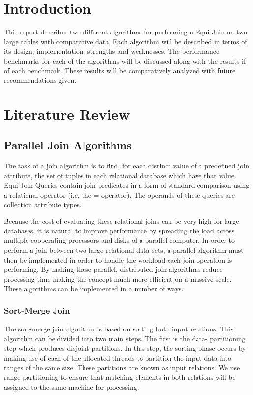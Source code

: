 \documentclass[10pt,twocolumn]{witseiepaper}
\begin{document}
\section{Introduction}

This report describes two different algorithms for performing a Equi-Join on two large tables with comparative data. Each algorithm will be described in terms of its design, implementation, strengths and weaknesses. The performance benchmarks for each of the algorithms will be discussed along with the results if of each benchmark. These results will be comparatively analyzed with future recommendations given.

\section{Literature Review}

\subsection{Parallel Join Algorithms}

The task of a join algorithm is to find, for each distinct value of a predefined join attribute, the set of tuples in each relational database which have that value. Equi Join Queries contain join predicates in a form of standard comparison using a relational operator (i.e. the = operator). The operands of these queries are collection attribute types.

Because the cost of evaluating these relational joins can be very high for large databases, it is natural to improve performance by spreading the load across multiple cooperating processors and disks of a parallel computer. In order to perform a join between two large relational data sets, a parallel algorithm must then be implemented in order to handle the workload each join operation is performing. By making these parallel, distributed join algorithms reduce processing time making the concept much more efficient on a massive scale. These algorithms can be implemented in a number of ways.

\subsubsection{Sort-Merge Join}\label{sortmerge}

The sort-merge join algorithm is based on sorting both input relations. This algorithm can be divided into two main steps. The first is the data- partitioning step which produces disjoint partitions. In this step, the sorting phase occurs by making use of each of the allocated threads to partition the input data into ranges of the same size. These partitions are known as input relations. We use range-partitioning to ensure that matching elements in both relations will be assigned to the same machine for processing. 
\end{document}
